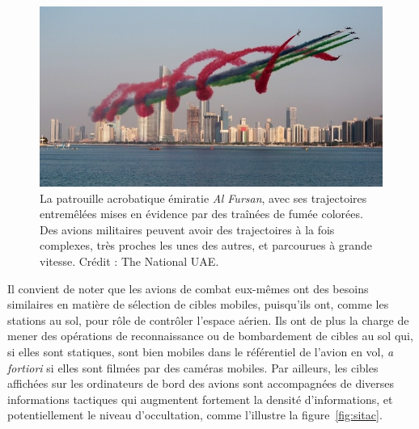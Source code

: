 	\begin{figure}[H]
		\centering
		\includegraphics[width=\textwidth]{figures/ch1/AlFursan}
		\caption[La patrouille acrobatique \emph{Al Fursan}.]{La patrouille acrobatique émiratie \emph{Al Fursan}, avec ses trajectoires entremêlées mises en évidence par des traînées de fumée colorées. Des avions militaires peuvent avoir des trajectoires à la fois complexes, très proches les unes des autres, et parcourues à grande vitesse. Crédit : The National UAE\footnotemark.}
		\label{fig:alfursan}
	\end{figure}
	
	
	Il convient de noter que les avions de combat eux-mêmes ont des besoins similaires en matière de sélection de cibles mobiles, puisqu'ils ont, comme les stations au sol, pour rôle de contrôler l'espace aérien. Ils ont de plus la charge de mener des opérations de reconnaissance ou de bombardement de cibles au sol qui, si elles sont statiques, sont bien mobiles dans le référentiel de l'avion en vol, \emph{a fortiori} si elles sont filmées par des caméras mobiles. Par ailleurs, les cibles affichées sur les ordinateurs de bord des avions sont accompagnées de diverses informations tactiques qui augmentent fortement la densité d'informations, et potentiellement le niveau d'occultation, comme l'illustre la figure~\ref{fig:sitac}.
	
